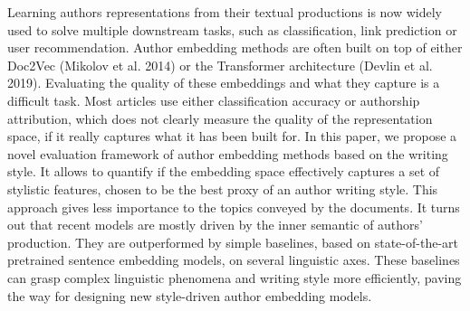 Learning authors representations from their textual productions is now widely used to solve multiple downstream tasks, such as classification, link prediction or user recommendation. Author embedding methods are often built on top of either Doc2Vec (Mikolov et al. 2014) or the Transformer architecture (Devlin et al. 2019). Evaluating the quality of these embeddings and what they capture is a difficult task. Most articles use either classification accuracy or authorship attribution, which does not clearly measure the quality of the representation space, if it really captures what it has been built for. In this paper, we propose a novel evaluation framework of author embedding methods based on the writing style. It allows to quantify if the embedding space effectively captures a set of stylistic features, chosen to be the best proxy of an author writing style. This approach gives less importance to the topics conveyed by the documents. It turns out that recent models are mostly driven by the inner semantic of authors' production. They are outperformed by simple baselines, based on state-of-the-art pretrained sentence embedding models, on several linguistic axes. These baselines can grasp complex linguistic phenomena and writing style more efficiently, paving the way for designing new style-driven author embedding models.
